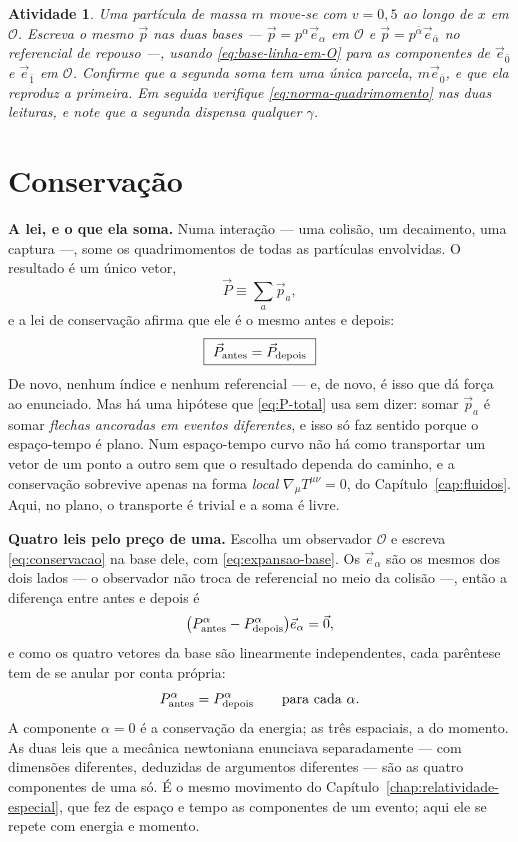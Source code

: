\documentclass[12pt,a4paper,oneside]{book}
\theoremstyle{rgplain}
\newtheorem{activity}{Atividade}[chapter]
\theoremstyle{rgremark}
\newcommand{\obs}{\mathcal{O}}
\begin{document}
\begin{activity}
Uma partícula de massa $m$ move-se com $v=0{,}5$ ao longo de $x$ em $\obs$.
Escreva o mesmo $\vec p$ nas duas bases --- $\vec p=p^\alpha\vec e_\alpha$ em
$\obs$ e $\vec p=p^{\bar\alpha}\vec e_{\bar\alpha}$ no referencial de repouso ---,
usando \eqref{eq:base-linha-em-O} para as componentes de $\vec e_{\bar 0}$ e
$\vec e_{\bar 1}$ em $\obs$. Confirme que a segunda soma tem uma única parcela,
$m\vec e_{\bar 0}$, e que ela reproduz a primeira. Em seguida verifique
\eqref{eq:norma-quadrimomento} nas duas leituras, e note que a segunda dispensa
qualquer $\gamma$.
\end{activity}

\section{Conservação}
\label{sec:conservacao}

\textbf{A lei, e o que ela soma.} Numa interação --- uma colisão, um
decaimento, uma captura ---, some os quadrimomentos de todas as partículas
envolvidas. O resultado é um único vetor,
\begin{equation}
  \vec P\equiv\sum_a\vec p_a ,
  \label{eq:P-total}
\end{equation}
e a lei de conservação afirma que ele é o mesmo antes e depois:
\begin{equation}
  \boxed{\ \vec P_{\rm antes}=\vec P_{\rm depois}\ }
  \label{eq:conservacao}
\end{equation}
De novo, nenhum índice e nenhum referencial --- e, de novo, é isso que dá
força ao enunciado. Mas há uma hipótese que \eqref{eq:P-total} usa sem dizer: somar $\vec p_a$ é somar \emph{flechas ancoradas em eventos
diferentes}, e isso só faz sentido porque o espaço-tempo é plano. Num
espaço-tempo curvo não há como transportar um vetor de um ponto a outro sem
que o resultado dependa do caminho, e a conservação sobrevive apenas na forma
\emph{local} $\nabla_\mu T^{\mu\nu}=0$, do Capítulo~\ref{cap:fluidos}. Aqui,
no plano, o transporte é trivial e a soma é livre.

\textbf{Quatro leis pelo preço de uma.} Escolha um observador $\obs$ e escreva
\eqref{eq:conservacao} na base dele, com \eqref{eq:expansao-base}. Os
$\vec e_\alpha$ são os mesmos dos dois lados --- o observador não troca de
referencial no meio da colisão ---, então a diferença entre antes e depois é
\[
  \bigl(P^\alpha_{\rm antes}-P^\alpha_{\rm depois}\bigr)\vec e_\alpha=\vec 0 ,
\]
e como os quatro vetores da base são linearmente independentes, cada parêntese
tem de se anular por conta própria:
\begin{equation}
  P^\alpha_{\rm antes}=P^\alpha_{\rm depois}
  \qquad\text{para cada }\alpha .
  \label{eq:conservacao-componentes}
\end{equation}
A componente $\alpha=0$ é a conservação da energia; as três espaciais, a do
momento. As duas leis que a mecânica newtoniana enunciava separadamente ---
com dimensões diferentes, deduzidas de argumentos diferentes --- são as quatro
componentes de uma só. É o mesmo movimento do Capítulo~\ref{chap:relatividade-especial},
que fez de espaço e tempo as componentes de um evento; aqui ele se repete com
energia e momento.
\end{document}
